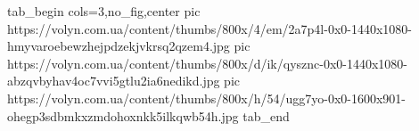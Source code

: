  
 
 
 
 


\ifcmt
  tab_begin cols=3,no_fig,center
     pic https://volyn.com.ua/content/thumbs/800x/4/em/2a7p4l-0x0-1440x1080-hmyvaroebewzhejpdzekjvkrsq2qzem4.jpg
		 pic https://volyn.com.ua/content/thumbs/800x/d/ik/qysznc-0x0-1440x1080-abzqvbyhav4oc7vvi5gtlu2ia6nedikd.jpg
		 pic https://volyn.com.ua/content/thumbs/800x/h/54/ugg7yo-0x0-1600x901-ohegp3sdbmkxzmdohoxnkk5ilkqwb54h.jpg
  tab_end
\fi
